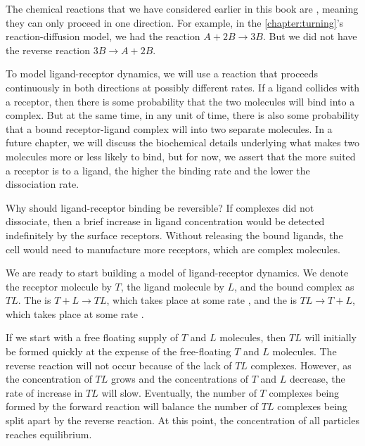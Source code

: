 The chemical reactions that we have considered earlier in this book are , meaning they can only proceed in one direction. For example, in the \autoref{chapter:turning}'s reaction-diffusion model, we had the reaction $A + 2B \rightarrow 3B$. But we did not have the reverse reaction $3B \rightarrow A + 2B$.

To model ligand-receptor dynamics, we will use a  reaction that proceeds continuously in both directions at possibly different rates. If a ligand collides with a receptor, then there is some probability that the two molecules will bind into a complex. But at the same time, in any unit of time, there is also some probability that a bound receptor-ligand complex will  into two separate molecules. In a future chapter, we will discuss the biochemical details underlying what makes two molecules more or less likely to bind, but for now, we assert that the more suited a receptor is to a ligand, the higher the binding rate and the lower the dissociation rate.

Why should ligand-receptor binding be reversible? If complexes did not dissociate, then a brief increase in ligand concentration would be detected indefinitely by the surface receptors. Without releasing the bound ligands, the cell would need to manufacture more receptors, which are complex molecules.

We are ready to start building a model of ligand-receptor dynamics. We denote the receptor molecule by $T$, the ligand molecule by $L$, and the bound complex as $TL$. The  is $T + L \rightarrow TL$, which takes place at some rate , and the  is $TL \rightarrow T + L$, which takes place at some rate .

If we start with a free floating supply of $T$ and $L$ molecules, then $TL$ will initially be formed quickly at the expense of the free-floating $T$ and $L$ molecules. The reverse reaction will not occur because of the lack of $TL$ complexes. However, as the concentration of $TL$ grows and the concentrations of  $T$ and $L$ decrease, the rate of increase in $TL$ will slow. Eventually, the number of $T$ complexes being formed by the forward reaction will balance the number of $TL$ complexes being split apart by the reverse reaction. At this point, the concentration of all particles reaches equilibrium.

